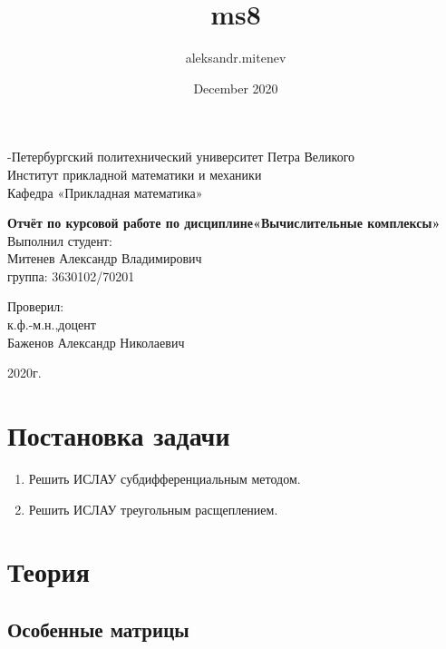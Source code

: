 \documentclass{article}
\title{ms8}
\author{aleksandr.mitenev }
\date{December 2020}
\begin{document}
\begin{titlepage}
	\clearpage\thispagestyle{empty}
	\centering
	\vspace{1cm}

	{-Петербургский политехнический университет Петра Великого\\
        Институт прикладной математики и механики\\
        Кафедра «Прикладная математика»
    \par}
    
	\vspace{4cm}
	{\huge \textbf{Отчёт по курсовой работе по дисциплине«Вычислительные комплексы»}} \\

	\vspace{4cm}
	{\hfill{} Выполнил студент:\\
	\hfill{}Митенев Александр Владимирович\\
	\hfill{}группа: 3630102/70201}
	\vspace{2cm}
	
    {\hfill{} Проверил:\\
	\hfill{}к.ф.-м.н.,доцент\\
	\hfill{}Баженов Александр Николаевич}
	
	
	\vspace{2cm}

	{\normalsize 2020г. \par}
	
	\pagebreak

\end{titlepage}


\tableofcontents
\pagebreak


\section{Постановка задачи}
\begin{enumerate}
\item Решить ИСЛАУ субдифференциальным методом.
\item Решить ИСЛАУ треугольным расщеплением.
\end{enumerate}

\section{Теория}
    \subsection{Особенные матрицы}
    
\end{document}
